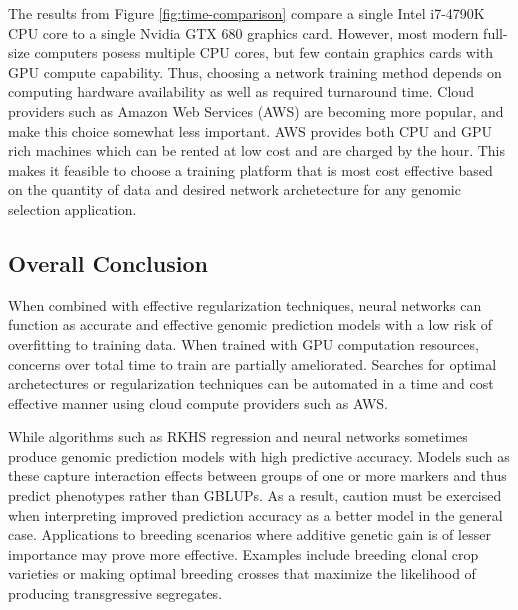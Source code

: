 
The results from Figure \ref{fig:time-comparison} compare a single Intel i7-4790K CPU 
core to a single Nvidia GTX 680 graphics card. However, most modern full-size computers posess 
multiple CPU cores, but few contain graphics cards with GPU compute capability. 
Thus, choosing a network training method depends on computing hardware availability 
as well as required turnaround time. Cloud providers such as Amazon Web Services (AWS) 
are becoming more popular, and make this choice somewhat less important. AWS 
provides both CPU and GPU rich machines which can be rented at low cost and 
are charged by the hour. This makes it feasible to choose a training platform 
that is most cost effective based on the quantity of data and desired network 
archetecture for any genomic selection application.

\ifdefined\showtablesandfigures
\fi

\subsection*{Overall Conclusion}

When combined with effective regularization techniques, neural networks can function
as accurate and effective genomic prediction models with a low risk of overfitting
to training data. When trained with GPU computation resources, concerns
over total time to train are partially ameliorated. Searches for optimal archetectures or 
regularization techniques can be automated in a time and cost effective 
manner using cloud compute providers such as AWS.

While algorithms such as RKHS regression and neural networks sometimes produce
genomic prediction models with high predictive accuracy. Models such as these
capture interaction effects between groups of one or more markers and thus 
predict phenotypes rather than GBLUPs. As a result, caution must be exercised when interpreting 
improved prediction accuracy as a better model in the general case. Applications 
to breeding scenarios where additive genetic gain is of lesser importance 
may prove more effective. Examples include breeding clonal crop varieties or 
making optimal breeding crosses that maximize the likelihood of producing
transgressive segregates.
